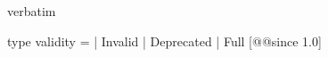 \begin{camlexample}{verbatim}
\begin{caml}
\begin{camlinput}
type validity = | Invalid | Deprecated | Full [@@since 1.0]
\end{camlinput}
\end{caml}
\end{camlexample}
